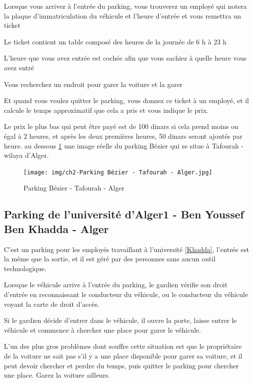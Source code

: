 Lorsque vous arrivez à l'entrée du parking, vous trouverez un employé qui notera la plaque d'immatriculation du véhicule et l'heure d'entrée et vous remettra un ticket

Le ticket contient un table composé des heures de la journée de 6 h à 23 h

L'heure que vous avez entrée est cochée afin que vous sachiez à quelle heure vous avez entré

Vous recherchez un endroit pour garer la voiture et la garer

Et quand vous voulez quitter le parking, vous donnez ce ticket à un employé, et il calcule le temps approximatif que cela a pris et vous indique le prix.

Le prix le plus bas qui peut être payé est de 100 dinars si cela prend moins ou égal à 2 heures, et après les deux premières heures, 50 dinars seront ajoutés par heure. 
au dessous \ref{Bézier} une image réelle du parking Bézier qui se situe à Tafourah - wilaya d'Alger.

\begin{figure}
	\centering
	\texttt{[image: img/ch2-Parking Bézier - Tafourah - Alger.jpg]}
	\caption{Parking Bézier - Tafourah - Alger}
 \label{Bézier}
\end{figure}

\subsection{Parking de l'université d'Alger1 - Ben Youssef Ben Khadda - Alger}  



C'est un parking pour les employés travaillant à l'université \ref{Khadda}, l'entrée est la même que la sortie, et il est géré par des personnes sans aucun outil technologique.

Lorsque le véhicule arrive à l'entrée du parking, le gardien vérifie son droit d'entrée en reconnaissant le conducteur du véhicule, ou le conducteur du véhicule voyant la carte de droit d'accès.

Si le gardien décide d'entrer dans le véhicule, il ouvre la porte, laisse entrer le véhicule et commence à chercher une place pour garer le véhicule.

L'un des plus gros problèmes dont souffre cette situation est que le propriétaire de la voiture ne sait pas s'il y a une place disponible pour garer sa voiture, et il peut devoir chercher et perdre du temps, puis quitter le parking pour chercher une place. Garez la voiture ailleurs.

